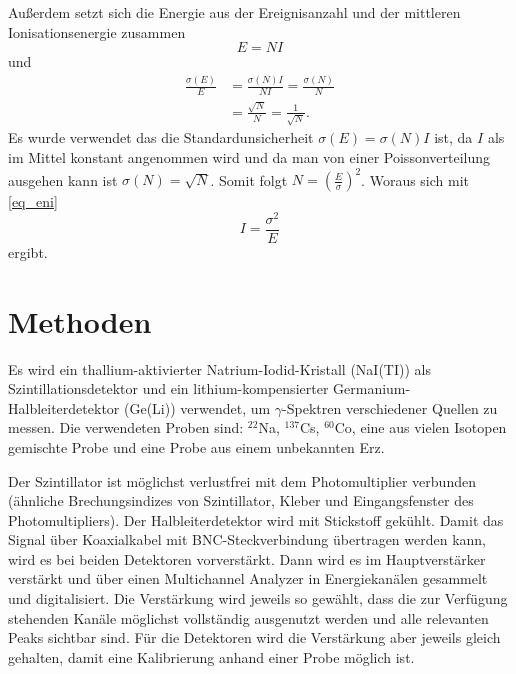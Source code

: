 \documentclass[
	a4paper,
	12pt,
	pagesize,
	ngerman
]{scrartcl}
\begin{document}
	Außerdem setzt sich die Energie aus der Ereignisanzahl und der mittleren Ionisationsenergie zusammen
	\begin{equation}
		\label{eq_eni}
		E=N I
	\end{equation}
	und
	\begin{align}
		\frac{\sigma(E)}{E} &= \frac{\sigma(N) I}{N I}= \frac{\sigma(N)}{N} \\
		&= \frac{\sqrt{N}}{N} = \frac{1}{\sqrt{N}}.
	\end{align}
	Es wurde verwendet das die Standardunsicherheit $\sigma(E)=\sigma(N)I$ ist, da $I$ als im Mittel konstant angenommen wird und da man von einer Poissonverteilung ausgehen kann ist $\sigma(N)=\sqrt{N}$.
	Somit folgt $N = \left(\frac{E}{\sigma}\right)^2$.
	Woraus sich mit \cref{eq_eni}
	\begin{equation}
		I = \frac{\sigma^2}{E}
	\end{equation}
	ergibt.

	\section{Methoden}

	Es wird ein thallium-aktivierter Natrium-Iodid-Kristall (NaI(TI)) als Szintillationsdetektor und  ein lithium-kompensierter Germanium-Halbleiterdetektor (Ge(Li)) verwendet, um $\gamma$-Spektren verschiedener Quellen zu messen.
	Die verwendeten Proben sind: $^{22}$Na, $^{137}$Cs, $^{60}$Co, eine aus vielen Isotopen gemischte Probe und eine Probe aus einem unbekannten Erz.

	Der Szintillator ist möglichst verlustfrei mit dem Photomultiplier verbunden (ähnliche Brechungsindizes von Szintillator, Kleber und Eingangsfenster des Photomultipliers).
	Der Halbleiterdetektor wird mit Stickstoff gekühlt.
	Damit das Signal über Koaxialkabel mit BNC-Steckverbindung übertragen werden kann, wird es bei beiden Detektoren vorverstärkt. %
	Dann wird es im Hauptverstärker verstärkt und über einen Multichannel Analyzer in Energiekanälen gesammelt und digitalisiert.
	Die Verstärkung wird jeweils so gewählt, dass die zur Verfügung stehenden Kanäle möglichst vollständig ausgenutzt werden und alle relevanten Peaks sichtbar sind.
	Für die Detektoren wird die Verstärkung aber jeweils gleich gehalten, damit eine Kalibrierung anhand einer Probe möglich ist.
\end{document}
